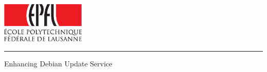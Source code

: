 
%        




\newcommand{\logoepfl}[0]{
  \begin{center}
    \includegraphics[width=4cm]{logo_epfl_coul.eps}
  \end{center}
  \vspace{0.3cm}
  \hrule
}
\newcommand{\project}[1]{
  \begin{center}
    \large{#1}
  \end{center}
  \vspace{1cm}
}
\newcommand{\department}[1]{
  \begin{center}
    \large{#1}
  \end{center}
}
\newcommand{\lab}[1]{
  \begin{center}
    \large{#1}
  \end{center}
}
\newcommand{\supervisor}[3]{
  \begin{center}
    \begin{normalsize}{
        \bf #1}\\#2\\#3
    \end{normalsize}
  \end{center}
}
\renewcommand{\author}[1]{
  \begin{center}
    \Large{#1}
  \end{center}
  \vspace{0.5cm}
}
\renewcommand{\title}[1]{
  \vspace{3cm}
  \begin{center}
    \huge{#1}
  \end{center}
  \vspace{1.7cm}
}
\renewcommand{\date}[2]{
  \begin{center}
    \normalsize{#1 #2}
  \end{center}
  \vspace{0.5cm}
}


\thispagestyle{empty}


  \logoepfl
  
  \title{Enhancing Debian Update Service}
  
